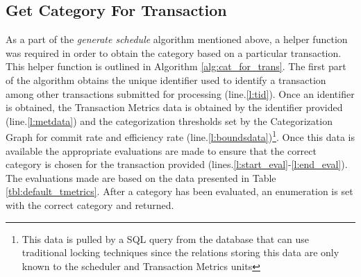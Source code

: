 \documentclass[conference]{IEEEtran}
\begin{document}
\subsection{Get Category For Transaction}
As a part of the \textit{generate schedule} algorithm mentioned above, a helper function was required in order to obtain the category based on a particular transaction. This helper function is outlined in Algorithm \ref{alg:cat_for_trans}. The first part of the algorithm obtains the unique identifier used to identify a transaction among other transactions submitted for processing (line.\ref{l:tid}). Once an identifier is obtained, the Transaction Metrics data is obtained by the identifier provided (line.\ref{l:metdata}) and the categorization thresholds set by the Categorization Graph for commit rate and efficiency rate (line.\ref{l:boundsdata})\footnote{This data is pulled by a SQL query from the database that can use traditional locking techniques since the relations storing this data are only known to the scheduler and Transaction Metrics units}. Once this data is available the appropriate evaluations are made to ensure that the correct category is chosen for the transaction provided (lines.\ref{l:start_eval}-\ref{l:end_eval}). The evaluations made are based on the data presented in Table \ref{tbl:default_tmetrics}. After a category has been evaluated, an enumeration is set with the correct category and returned.

\end{document}
